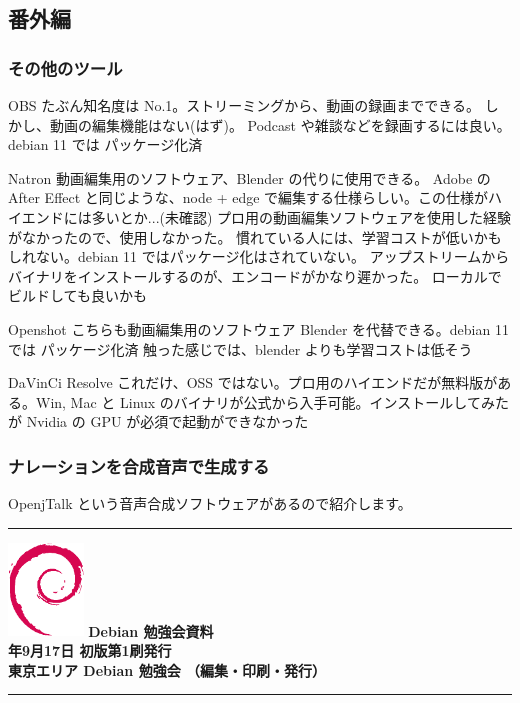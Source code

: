 \documentclass[mingoth,a4paper]{jsarticle}
\newcommand{\debmtgyear}{2022}
\newcommand{\debmtgmonth}{9}
\newcommand{\debmtgdate}{17}
\begin{document}
%
%
%
%
\subsection{番外編}
\subsubsection{その他のツール}
\begin{description}
\item{OBS}
たぶん知名度は No.1。ストリーミングから、動画の録画までできる。
しかし、動画の編集機能はない(はず)。
Podcast や雑談などを録画するには良い。debian 11 では パッケージ化済

\item{Natron}
動画編集用のソフトウェア、Blender の代りに使用できる。
Adobe の After Effect と同じような、node + edge で編集する仕様らしい。この仕様がハイエンドには多いとか...(未確認)
プロ用の動画編集ソフトウェアを使用した経験がなかったので、使用しなかった。
慣れている人には、学習コストが低いかもしれない。debian 11 ではパッケージ化はされていない。
アップストリームからバイナリをインストールするのが、エンコードがかなり遲かった。
ローカルでビルドしても良いかも

\item{Openshot}
こちらも動画編集用のソフトウェア Blender を代替できる。debian 11 では パッケージ化済
触った感じでは、blender よりも学習コストは低そう

\item{DaVinCi Resolve}
これだけ、OSS ではない。プロ用のハイエンドだが無料版がある。Win, Mac と Linux のバイナリが公式から入手可能。インストールしてみたが Nvidia の GPU が必須で起動ができなかった
  
\end{description}
\subsubsection{ナレーションを合成音声で生成する}
OpenjTalk という音声合成ソフトウェアがあるので紹介します。


\vspace*{15cm}
\hrule
\vspace{2mm}
\includegraphics[width=2cm]{image-assets/openlogo-nd.eps}
\noindent \Large \bf Debian 勉強会資料\\
\noindent \normalfont \debmtgyear{}年\debmtgmonth{}月\debmtgdate{}日 \hspace{5mm}  初版第1刷発行\\
\noindent \normalfont 東京エリア Debian 勉強会 （編集・印刷・発行）\\
\hrule
\end{document}
